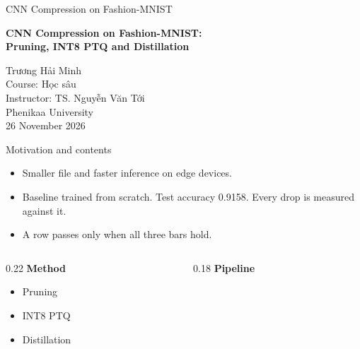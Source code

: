 \documentclass[aspectratio=169,11pt]{beamer}
\begin{document}
\begin{frame}{CNN Compression on Fashion-MNIST}
  \vspace{0.35cm}
  {\Large\bfseries CNN Compression on Fashion-MNIST:\\[0.25em]
  Pruning, INT8 PTQ and Distillation\par}
  \vspace{0.55cm}
  Trương Hải Minh\\[0.35em]
  Course: Học sâu\\
  Instructor: TS. Nguyễn Văn Tới\\
  Phenikaa University\\[0.45em]
  26 November 2026
\end{frame}

\begin{frame}[t]{Motivation and contents}
  \setlength{\itemsep}{2pt}%
  \begin{itemize}
    \item Smaller file and faster inference on edge devices.
    \item Baseline trained from scratch. Test accuracy 0.9158. Every drop is measured against it.
    \item A row passes only when all three bars hold.
  \end{itemize}
  \vspace{0.25em}
  \begin{center}
  \end{center}
  \vspace{0.2em}
  {\scriptsize
  \begin{columns}[t,onlytextwidth]
  \begin{column}{0.22\textwidth}
    \textbf{Method}
    \begin{itemize}\setlength{\itemsep}{1pt}
      \item Pruning
      \item INT8 PTQ
      \item Distillation
    \end{itemize}
  \end{column}
  \begin{column}{0.18\textwidth}
    \textbf{Pipeline}
    \begin{itemize}\setlength{\itemsep}{1pt}

\end{itemize}
\end{column}
\end{columns}}
\end{frame}
\end{document}
